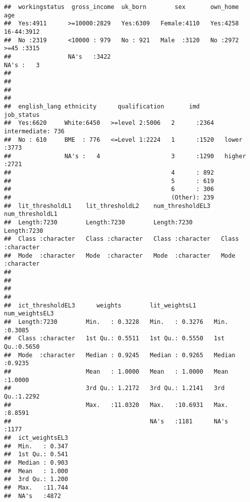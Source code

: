 \documentclass[
]{article}
\begin{document}
\begin{verbatim}
##  workingstatus  gross_income  uk_born        sex       own_home      age      
##  Yes:4911      >=10000:2829   Yes:6309   Female:4110   Yes:4258   16-44:3912  
##  No :2319      <10000 : 979   No : 921   Male  :3120   No :2972   >=45 :3315  
##                NA's   :3422                                       NA's :   3  
##                                                                               
##                                                                               
##                                                                               
##                                                                               
##  english_lang ethnicity      qualification       imd              job_status  
##  Yes:6620     White:6450   >=level 2:5006   2      :2364   intermediate: 736  
##  No : 610     BME  : 776   <=Level 1:2224   1      :1520   lower       :3773  
##               NA's :   4                    3      :1290   higher      :2721  
##                                             4      : 892                      
##                                             5      : 619                      
##                                             6      : 306                      
##                                             (Other): 239                      
##  lit_thresholdL1    lit_thresholdL2    num_thresholdEL3   num_thresholdL1   
##  Length:7230        Length:7230        Length:7230        Length:7230       
##  Class :character   Class :character   Class :character   Class :character  
##  Mode  :character   Mode  :character   Mode  :character   Mode  :character  
##                                                                             
##                                                                             
##                                                                             
##                                                                             
##  ict_thresholdEL3      weights        lit_weightsL1     num_weightsEL3  
##  Length:7230        Min.   : 0.3228   Min.   : 0.3276   Min.   :0.3085  
##  Class :character   1st Qu.: 0.5511   1st Qu.: 0.5550   1st Qu.:0.5650  
##  Mode  :character   Median : 0.9245   Median : 0.9265   Median :0.9235  
##                     Mean   : 1.0000   Mean   : 1.0000   Mean   :1.0000  
##                     3rd Qu.: 1.2172   3rd Qu.: 1.2141   3rd Qu.:1.2292  
##                     Max.   :11.0320   Max.   :10.6931   Max.   :8.8591  
##                                       NA's   :1181      NA's   :1177    
##  ict_weightsEL3  
##  Min.   : 0.347  
##  1st Qu.: 0.541  
##  Median : 0.903  
##  Mean   : 1.000  
##  3rd Qu.: 1.200  
##  Max.   :11.744  
##  NA's   :4872
\end{verbatim}
\end{document}
